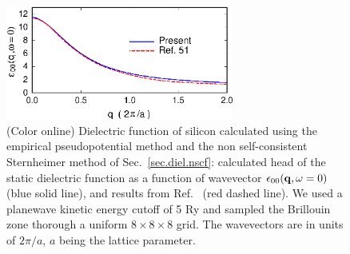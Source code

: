 \documentclass[twocolumn,prb,showpacs,superscriptaddress]{revtex4}
\def\w{\omega}
\def\q{{\bf q}}
\begin{document}
\begin  {figure}
\begin  {center}
\includegraphics[width=7.5cm]{fig1.eps}
\end    {center}
\caption{\label{fig1}
        (Color online)
        Dielectric function of silicon calculated using the empirical pseudopotential method and the
        non self-consistent Sternheimer method of Sec.\ \ref{sec.diel.nscf}:
        calculated head of the static dielectric function as a function of wavevector $\epsilon_{00}(\q,\w=0)$ (blue solid line),
        and results from Ref.\  (red dashed line). We used a planewave kinetic energy cutoff of 5 Ry
        and sampled the Brillouin zone thorough a uniform $8\times 8\times 8$ grid.
        The wavevectors are in units of $2\pi/a$, $a$ being the lattice parameter.
        }
\end    {figure}
\end{document}
